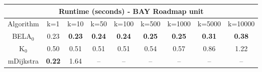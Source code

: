 \begin{tabular}{c|cccccccc}\toprule
\multicolumn{9}{c}{Runtime (seconds) - BAY Roadmap unit}\\ \midrule
Algorithm & k=1 & k=10 & k=50 & k=100 & k=500 & k=1000 & k=5000 & k=10000 \\ \midrule
BELA$_0$ & 0.23 & \textbf{0.23} & \textbf{0.24} & \textbf{0.24} & \textbf{0.25} & \textbf{0.25} & \textbf{0.31} & \textbf{0.38} \\
K$_0$ & 0.50 & 0.51 & 0.51 & 0.51 & 0.54 & 0.57 & 0.86 & 1.22 \\
mDijkstra & \textbf{0.22} & 1.64 & -- & -- & -- & -- & -- & -- \\ \bottomrule 
\end{tabular}
